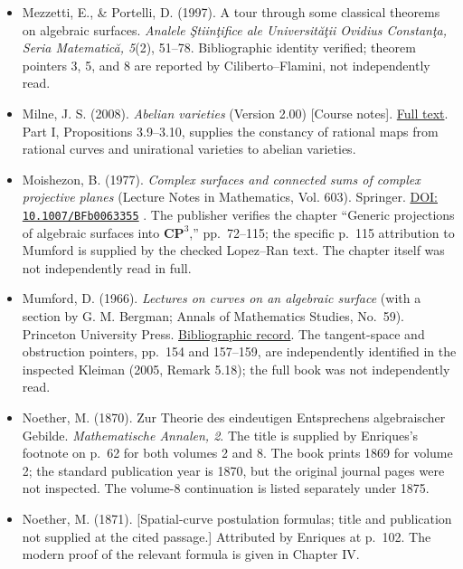 \begin{sloppypar}
\begin{itemize}
\item Mezzetti, E., \& Portelli, D. (1997). A tour through some classical theorems on algebraic surfaces. \emph{Analele Ştiinţifice ale Universităţii Ovidius Constanţa, Seria Matematică, 5}(2), 51--78. Bibliographic identity verified; theorem pointers 3, 5, and 8 are reported by Ciliberto--Flamini, not independently read.

\item Milne, J. S. (2008). \emph{Abelian varieties} (Version 2.00) {[}Course notes{]}. \href{https://www.jmilne.org/math/CourseNotes/AV.pdf}{Full text}. Part I, Propositions 3.9--3.10, supplies the constancy of rational maps from rational curves and unirational varieties to abelian varieties.

\item Moishezon, B. (1977). \emph{Complex surfaces and connected sums of complex projective planes} (Lecture Notes in Mathematics, Vol. 603). Springer. \href{https://doi.org/10.1007/BFb0063355}{DOI: \nolinkurl{10.1007/BFb0063355}} . The publisher verifies the chapter ``Generic projections of algebraic surfaces into \(\mathbf{CP}^3\),'' pp.~72--115; the specific p.~115 attribution to Mumford is supplied by the checked Lopez--Ran text. The chapter itself was not independently read in full.

\item Mumford, D. (1966). \emph{Lectures on curves on an algebraic surface} (with a section by G. M. Bergman; Annals of Mathematics Studies, No.~59). Princeton University Press. \href{https://stacks.math.columbia.edu/bibliography/Mum}{Bibliographic record}. The tangent-space and obstruction pointers, pp.~154 and 157--159, are independently identified in the inspected Kleiman (2005, Remark 5.18); the full book was not independently read.

\item Noether, M. (1870). Zur Theorie des eindeutigen Entsprechens algebraischer Gebilde. \emph{Mathematische Annalen, 2}. The title is supplied by Enriques's footnote on p.~62 for both volumes 2 and 8. The book prints 1869 for volume 2; the standard publication year is 1870, but the original journal pages were not inspected. The volume-8 continuation is listed separately under 1875.

\item Noether, M. (1871). {[}Spatial-curve postulation formulas; title and publication not supplied at the cited passage.{]} Attributed by Enriques at p.~102. The modern proof of the relevant formula is given in Chapter IV.


\end{itemize}
\end{sloppypar}

